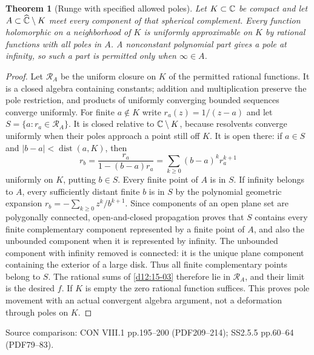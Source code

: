 \documentclass[11pt,a4paper,openany]{book}
\newtheorem{theorem}{Theorem}[chapter]
\theoremstyle{definition}
\theoremstyle{remark}\newtheorem{remark}[theorem]{Remark}
\DeclareMathOperator{\dist}{dist}\DeclareMathOperator{\ord}{ord}
\newcommand{\family}[1]{}
\newcommand{\source}[1]{\par\begingroup\small\sffamily\color{black!65}Source comparison: #1\par\endgroup}
\begin{document}
\begin{theorem}[Runge with specified allowed poles]\family{D12.15.04}\label{d12:15-04}
Let $K\subset\mathbb C$ be compact and let $A\subset\widehat{\mathbb C}\setminus K$ meet every component of that spherical complement. Every function holomorphic on a neighborhood of $K$ is uniformly approximable on $K$ by rational functions with all poles in $A$. A nonconstant polynomial part gives a pole at infinity, so such a part is permitted only when $\infty\in A$.
\end{theorem}
\begin{proof}
Let $\mathcal R_A$ be the uniform closure on $K$ of the permitted rational functions. It is a closed algebra containing constants; addition and multiplication preserve the pole restriction, and products of uniformly converging bounded sequences converge uniformly. For finite $a\notin K$ write $r_a(z)=1/(z-a)$ and let $S=\{a:r_a\in\mathcal R_A\}$. It is closed relative to $\mathbb C\setminus K$, because resolvents converge uniformly when their poles approach a point still off $K$. It is open there: if $a\in S$ and $|b-a|<\dist(a,K)$, then
\[
 r_b=\frac{r_a}{1-(b-a)r_a}
 =\sum_{k\ge0}(b-a)^k r_a^{k+1}
\]
uniformly on $K$, putting $b\in S$. Every finite point of $A$ is in $S$. If infinity belongs to $A$, every sufficiently distant finite $b$ is in $S$ by the polynomial geometric expansion $r_b=-\sum_{k\ge0}z^k/b^{k+1}$. Since components of an open plane set are polygonally connected, open-and-closed propagation proves that $S$ contains every finite complementary component represented by a finite point of $A$, and also the unbounded component when it is represented by infinity. The unbounded component with infinity removed is connected: it is the unique plane component containing the exterior of a large disk. Thus all finite complementary points belong to $S$. The rational sums of \cref{d12:15-03} therefore lie in $\mathcal R_A$, and their limit is the desired $f$. If $K$ is empty the zero rational function suffices. This proves pole movement with an actual convergent algebra argument, not a deformation through poles on $K$.
\end{proof}
\source{CON VIII.1 pp.195--200 (PDF209--214); SS2.5.5 pp.60--64 (PDF79--83).}
\end{document}
